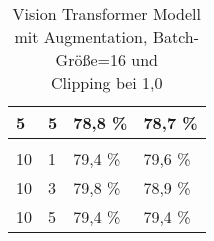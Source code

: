 \begin{table}[!htb]
\begin{tabular}{|llll|}
\multicolumn{1}{|l|}{5}                               & \multicolumn{1}{l|}{5}                                                                                & \multicolumn{1}{l|}{78,8 \%}                              & 78,7 \%            \\ \hline
\multicolumn{1}{|l|}{}                                & \multicolumn{1}{l|}{}                                                                                 & \multicolumn{1}{l|}{}                                     &                    \\ \hline
\multicolumn{1}{|l|}{10}                              & \multicolumn{1}{l|}{1}                                                                                & \multicolumn{1}{l|}{79,4 \%}                              & 79,6 \%            \\ \hline
\multicolumn{1}{|l|}{10}                              & \multicolumn{1}{l|}{3}                                                                                & \multicolumn{1}{l|}{79,8 \%}                              & 78,9 \%            \\ \hline
\multicolumn{1}{|l|}{10}                              & \multicolumn{1}{l|}{5}                                                                                & \multicolumn{1}{l|}{79,4 \%}                              & 79,4 \%            \\ \hline
\end{tabular}
\caption{Vision Transformer Modell mit Augmentation, Batch-Größe=16 und \\Clipping bei 1,0}
\label{tab:vit_dpsgd1}
\end{table}